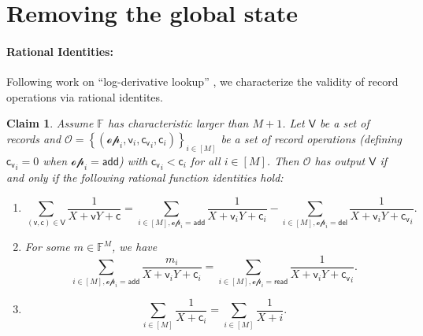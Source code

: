 \documentclass[11pt]{article} %
\newcommand{\F}{\ensuremath{\mathbb F}\xspace}
\newcommand{\sett}[2]{\ensuremath{\set{#1}_{#2}}\xspace}
\newcommand{\set}[1]{\ensuremath{\left\{#1\right\}}\xspace}
\newtheorem{claim}[lemma]{Claim}
\renewcommand{\c}{\ensuremath{\mathsf{c}}\xspace}
\newcommand{\vc}{\ensuremath{\mathsf{c_v}}\xspace}
\renewcommand{\v}{\ensuremath{\mathsf{v}}\xspace}
\newcommand{\add}{\ensuremath{\mathsf{add}}\xspace}
\newcommand{\del}{\ensuremath{\mathsf{del}}\xspace}
\renewcommand{\read}{\ensuremath{\mathsf{read}}\xspace}
\newcommand{\countrange}{\ensuremath{[M]}\xspace}
\newcommand{\ops}{\ensuremath{\mathcal{O}}\xspace}
\newcommand{\op}{\ensuremath{\mathscr{op}}\xspace}
\newcommand{\recset}{\ensuremath{\mathsf{V}}\xspace}
\begin{document}
\section{Removing the global state}\label{sec:Fstar}

\paragraph{Rational Identities:}
Following work on ``log-derivative lookup'' \cite{bplusplus,logup}, we characterize the validity of record operations via rational identites.
\begin{claim}\label{clm:reducetologder}
Assume $\F$ has characteristic larger than $M+1$.
Let \recset be a set of records and $\ops=\sett{(\op_i,\v_i,\vc_i,\c_i)}{i\in \countrange}$ be a set of record operations (defining $\vc_i=0$ when $\op_i=\add$) with $\vc_i<\c_i$ for all $i\in \countrange$.
Then \ops has output \recset if and only if the following rational function identities hold:
\begin{enumerate}
 \item \[\sum_{(\v,\c)\in \recset}\frac{1}{X+\v Y+\c}=\sum_{i\in \countrange,\op_i=\add}\frac{1}{X+\v_i Y+\c_i}-\sum_{i\in \countrange, \op_i=\del}\frac{1}{X+\v_i Y+\vc_i}.\]
 \item For some $m\in \F^M$, we have
 \[\sum_{i\in \countrange,\op_i=\add}\frac{m_i}{X+\v_i Y+\c_i}=\sum_{i\in \countrange, \op_i=\read}\frac{1}{X+\v_i Y+\vc_i}.\]
 \item \[\sum_{i\in \countrange}\frac{1}{X+\c_i}=\sum_{i\in \countrange}\frac{1}{X+i}.\]
\end{enumerate}
\end{claim}
\end{document}
